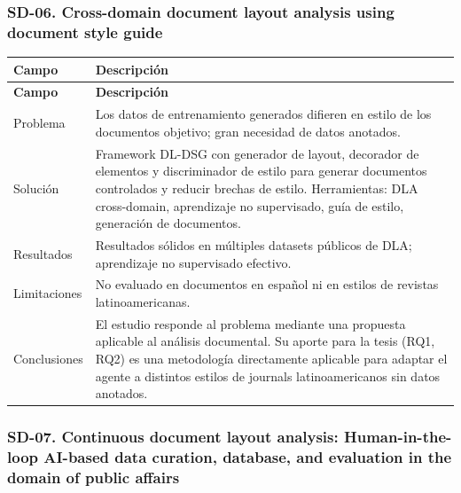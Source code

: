 \subsubsection*{SD-06. Cross-domain document layout analysis using document style guide}

\begin{longtable}{@{}>{\raggedright\arraybackslash}p{}>{\raggedright\arraybackslash}p{}@{}}
\toprule
\textbf{Campo} & \textbf{Descripción} \\
\midrule
\endfirsthead
\toprule
\textbf{Campo} & \textbf{Descripción} \\
\midrule
\endhead
\bottomrule
\endfoot
\endlastfoot
Problema & Los datos de entrenamiento generados difieren en estilo de los documentos objetivo; gran necesidad de datos anotados. \\
Solución & Framework DL-DSG con generador de layout, decorador de elementos y discriminador de estilo para generar documentos controlados y reducir brechas de estilo. Herramientas: DLA cross-domain, aprendizaje no supervisado, guía de estilo, generación de documentos. \\
Resultados & Resultados sólidos en múltiples datasets públicos de DLA; aprendizaje no supervisado efectivo. \\
Limitaciones & No evaluado en documentos en español ni en estilos de revistas latinoamericanas. \\
Conclusiones & El estudio responde al problema mediante una propuesta aplicable al análisis documental. Su aporte para la tesis (RQ1, RQ2) es una metodología directamente aplicable para adaptar el agente a distintos estilos de journals latinoamericanos sin datos anotados. \\
\end{longtable}

\subsubsection*{SD-07. Continuous document layout analysis: Human-in-the-loop AI-based data curation, database, and evaluation in the domain of public affairs}

